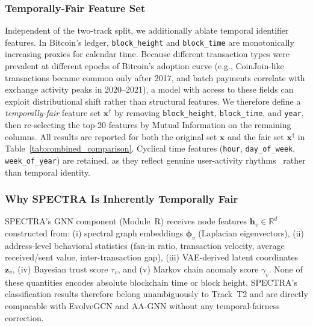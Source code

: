 \subsubsection{Temporally-Fair Feature Set}
Independent of the two-track split, we additionally ablate temporal
identifier features.
In Bitcoin's ledger, \texttt{block\_height} and \texttt{block\_time}
are monotonically increasing proxies for calendar time.
Because different transaction types were prevalent at different epochs
of Bitcoin's adoption curve (e.g., CoinJoin-like transactions became
common only after 2017, and batch payments correlate with exchange activity
peaks in 2020--2021), a model with access to these fields can exploit
distributional shift rather than structural features.
We therefore define a \emph{temporally-fair} feature set
$\mathbf{x}^{\dagger}$ by removing \texttt{block\_height},
\texttt{block\_time}, and \texttt{year}, then re-selecting the top-20
features by Mutual Information on the remaining columns.
All results are reported for both the original set $\mathbf{x}$ and
the fair set $\mathbf{x}^{\dagger}$ in Table~\ref{tab:combined_comparison}.
Cyclical time features (\texttt{hour}, \texttt{day\_of\_week},
\texttt{week\_of\_year}) are retained, as they reflect genuine
user-activity rhythms~\cite{Ron2013} rather than temporal identity.

\subsubsection{Why SPECTRA Is Inherently Temporally Fair}
SPECTRA's GNN component (Module~R) receives node features
$\mathbf{h}_v \in \mathbb{R}^{d}$ constructed from:
(i) spectral graph embeddings $\boldsymbol{\phi}_v$ (Laplacian eigenvectors),
(ii) address-level behavioral statistics (fan-in ratio, transaction velocity,
average received/sent value, inter-transaction gap),
(iii) VAE-derived latent coordinates $\mathbf{z}_v$,
(iv) Bayesian trust score $\tau_v$, and
(v) Markov chain anomaly score $\gamma_v$.
None of these quantities encodes absolute blockchain time or block height.
SPECTRA's classification results therefore belong unambiguously to Track~T2
and are directly comparable with EvolveGCN and AA-GNN without any
temporal-fairness correction.

%
%
%
%
